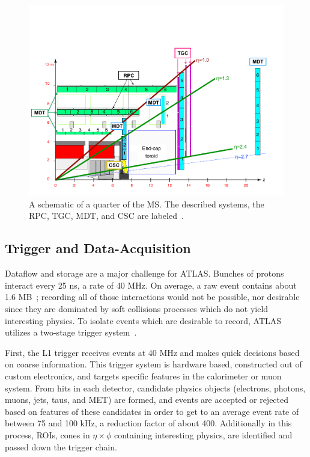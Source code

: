 \begin{figure}[!htbp]
    \centering
    \includegraphics[width=.75\textwidth]{chapters/chapter2_experiment/images/muon_detector.png}
    \caption[A schematic of a quarter of the \gls{MS}]{A schematic of a quarter of the \gls{MS}. The described systems, the \gls{RPC}, \gls{TGC}, \gls{MDT}, and \gls{CSC} are labeled~\cite{muon-performance2015}.}
    \label{fig:muon-schematic}
\end{figure}

\subsection{Trigger and Data-Acquisition}\label{ssec:tdaq}

Dataflow and storage are a major challenge for ATLAS. Bunches of protons interact every 25 ns, a rate of 40 MHz. On average, a raw event contains about 1.6 MB~\cite{ATLASfact-sheet}; recording all of those interactions would not be possible, nor desirable since they are dominated by soft collisions processes which do not yield interesting physics. To isolate events which are desirable to record, ATLAS utilizes a two-stage trigger system~\cite{triggerTDR}.

First, the \gls{L1} trigger receives events at 40 MHz and makes quick decisions based on coarse information. This trigger system is hardware based, constructed out of custom electronics, and targets specific features in the calorimeter or muon system. From hits in each detector, candidate physics objects (electrons, photons, muons, jets, taus, and \gls{MET}) are formed, and events are accepted or rejected based on features of these candidates in order to get to an average event rate of between 75 and 100 kHz, a reduction factor of about 400. Additionally in this process, \glspl{ROI}, cones in $\eta \times \phi$ containing interesting physics, are identified and passed down the trigger chain.

